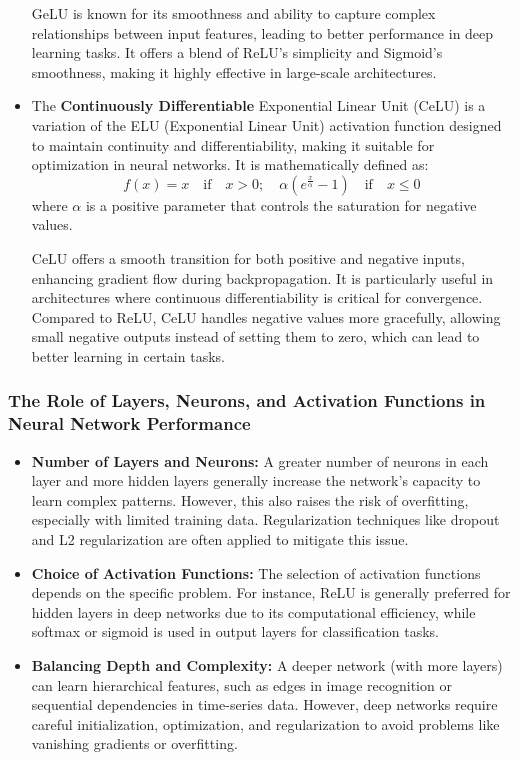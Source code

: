 \documentclass[english,12pt, titlepage]{article}
\begin{document}
\begin{itemize}
		GeLU is known for its smoothness and ability to capture complex relationships between input features, leading to better performance in deep learning tasks. It offers a blend of ReLU's simplicity and Sigmoid's smoothness, making it highly effective in large-scale architectures.
		\item The \textbf{Continuously Differentiable} Exponential Linear Unit (CeLU) is a variation of the ELU (Exponential Linear Unit) activation function designed to maintain continuity and differentiability, making it suitable for optimization in neural networks. It is mathematically defined as:
		\begin{equation*}
			f(x) = x \quad \text{if} \quad x>0;\quad  \alpha (e^{\frac{x}{\alpha}}-1) \quad \text{if} \quad  x \leq 0 
		\end{equation*}
		where $\alpha$ is a positive parameter that controls the saturation for negative values.
		
		CeLU offers a smooth transition for both positive and negative inputs, enhancing gradient flow during backpropagation. It is particularly useful in architectures where continuous differentiability is critical for convergence. Compared to ReLU, CeLU handles negative values more gracefully, allowing small negative outputs instead of setting them to zero, which can lead to better learning in certain tasks.
	\end{itemize}
	
	\subsubsection{The Role of Layers, Neurons, and Activation Functions in Neural Network Performance}
	\begin{itemize}
		\item \textbf{Number of Layers and Neurons:} A greater number of neurons in each layer and more hidden layers generally increase the network's capacity to learn complex patterns. However, this also raises the risk of overfitting, especially with limited training data. Regularization techniques like dropout and L2 regularization are often applied to mitigate this issue.
		\item \textbf{Choice of Activation Functions: }The selection of activation functions depends on the specific problem. For instance, ReLU is generally preferred for hidden layers in deep networks due to its computational efficiency, while softmax or sigmoid is used in output layers for classification tasks.
		\item \textbf{Balancing Depth and Complexity:} A deeper network (with more layers) can learn hierarchical features, such as edges in image recognition or sequential dependencies in time-series data. However, deep networks require careful initialization, optimization, and regularization to avoid problems like vanishing gradients or overfitting.
	\end{itemize}
	
\end{document}

